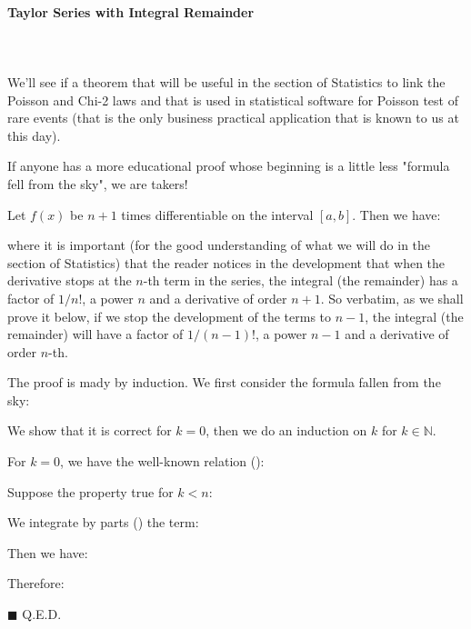 	\paragraph{Taylor Series with Integral Remainder}\mbox{}\\\\
	We'll see if a theorem that will be useful in the section of Statistics to link the Poisson and Chi-2 laws and that is used in statistical software for Poisson test of rare events (that is the only business practical application that is known to us at this day).
	\begin{tcolorbox}[title=Remark,colframe=black,arc=10pt]
	If anyone has a more educational proof whose beginning is a little less "formula fell from the sky", we are takers!
	\end{tcolorbox}
	\begin{theorem}
	Let $f(x)$ be $n + 1$ times differentiable on the interval $[a, b]$. Then we have:
	
	where it is important (for the good understanding of what we will do in the section of Statistics) that the reader notices in the development that when the derivative stops at the $n$-th term in the series, the integral (the remainder) has a factor of $1 / n !$, a power $n$ and a derivative of order $n + 1$. So verbatim, as we shall prove it below, if we stop the development of the terms to $n-1$, the integral (the remainder) will have a factor of $1 / (n-1) !$, a power $n-1$ and a derivative of order $n$-th.
	\end{theorem}
	\begin{dem}
	The proof is mady by induction. We first consider the formula fallen from the sky:
	
	We show that it is correct for $k = 0$, then we do an induction on $k$ for $k\in \mathbb{N}$.
	
	For $k = 0$, we have the well-known relation ():
	
	Suppose the property true for $k<n$:
	
	We integrate by parts () the term:
	
	Then we have:
	
	Therefore:
	
	\begin{flushright}
		$\blacksquare$  Q.E.D.
	\end{flushright}
	\end{dem}
	
